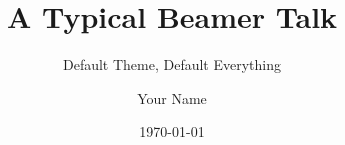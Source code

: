 \documentclass{beamer}
\title{A Typical Beamer Talk}
\subtitle{Default Theme, Default Everything}
\author{Your Name}
\institute{Your University}
\date{\today}
\begin{document}
\frame{\titlepage}
\end{document}

